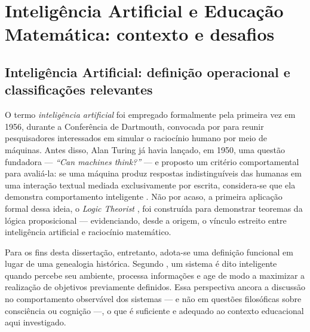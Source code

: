 \chapter{Inteligência Artificial e Educação Matemática: contexto e desafios}
\label{cap:contexto}


\section{Inteligência Artificial: definição operacional e classificações relevantes}
\label{sec:ia-definicao}

O termo \emph{inteligência artificial} foi empregado formalmente pela primeira vez em
1956, durante a Conferência de Dartmouth, convocada por \citet{mccarthy1955dartmouth} para
reunir pesquisadores interessados em simular o raciocínio humano por meio de máquinas. Antes
disso, Alan Turing já havia lançado, em 1950, uma questão fundadora --- \emph{``Can machines
think?''} --- e proposto um critério comportamental para avaliá-la: se uma máquina produz
respostas indistinguíveis das humanas em uma interação textual mediada exclusivamente por
escrita, considera-se que ela demonstra comportamento inteligente \citep{turing1950computing}.
Não por acaso, a primeira aplicação formal dessa ideia, o \emph{Logic Theorist}
\citep{newell1956logic}, foi construída para demonstrar teoremas da lógica proposicional ---
evidenciando, desde a origem, o vínculo estreito entre inteligência artificial e raciocínio
matemático.

Para os fins desta dissertação, entretanto, adota-se uma definição funcional em lugar de uma
genealogia histórica. Segundo \citet{russell2021aima}, um sistema é dito inteligente quando
percebe seu ambiente, processa informações e age de modo a maximizar a realização de objetivos
previamente definidos. Essa perspectiva ancora a discussão no comportamento observável dos
sistemas --- e não em questões filosóficas sobre consciência ou cognição ---, o que é suficiente
e adequado ao contexto educacional aqui investigado.

